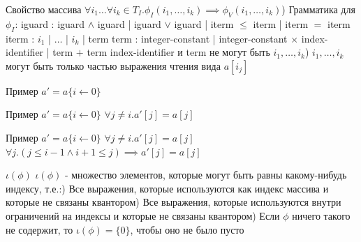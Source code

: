 \documentclass{beamer}
\begin{document}
\begin{frame}{Свойство массива}
$\forall i_1 \dots \forall i_k \in T_I. \phi_I(i_1, \dots, i_k) \implies \phi_V(i_1, \dots, i_k)$) Грамматика для $\phi_I$:\newline
iguard : iguard $\wedge$ iguard | iguard $\vee$ iguard | iterm $\le$ iterm | iterm $=$ iterm\newline
iterm : $i_1$ | $\dots$ | $i_k$ | term\newline
term : integer-constant | integer-constant $\times$ index-identifier | term $+$ term\newline
index-identifier и term не могут быть $i_1, \dots, i_k$) $i_1, \dots, i_k$ могут быть только частью выражения чтения вида $a[i_j]$\newline
\end{frame}

\begin{frame}{Пример}
$a' = a\{i\leftarrow 0\}$\newline
\end{frame}

\begin{frame}{Пример}
$a' = a\{i\leftarrow 0\}$\newline
$\forall j \ne i. a'[j] = a[j]$\newline
\end{frame}

\begin{frame}{Пример}
$a' = a\{i\leftarrow 0\}$\newline
$\forall j \ne i. a'[j] = a[j]$\newline
$\forall j. (j \le i - 1 \wedge i + 1 \le j) \implies a'[j] = a[j]$
\end{frame}

\begin{frame}{$\iota(\phi)$}
$\iota(\phi)$ - множество элементов, которые могут быть равны какому-нибудь индексу, т.е.:) Все выражения, которые используются как индекс массива и которые не связаны квантором) Все выражения, которые используются внутри ограничений на индексы и которые не связаны квантором) Если $\phi$ ничего такого не содержит, то $\iota(\phi) = \{0\}$, чтобы оно не было пусто\newline
\end{frame}
\end{document}
